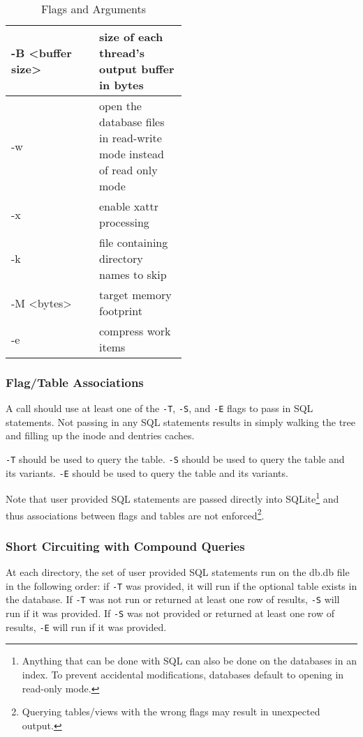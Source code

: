 \begin{table}[h!]
\begin{tabular*}{\linewidth}{l|p{0.5\linewidth}}
    \hline
    -B \textless buffer size\textgreater & size of each thread's output buffer in bytes \\
    \hline
    -w & open the database files in read-write mode instead of read only mode \\
    \hline
    -x & enable xattr processing \\
    \hline
    -k & file containing directory names to skip \\
    \hline
    -M \textless bytes\textgreater & target memory footprint \\
    \hline
    -e & compress work items \\
    \hline
  \end{tabular*}
  \caption{\label{tab:widgets} \gufiquery Flags and Arguments}
\end{table}

\subsubsection{Flag/Table Associations}
A \gufiquery call should use at least one of the \texttt{-T},
\texttt{-S}, and \texttt{-E} flags to pass in SQL statements. Not
passing in any SQL statements results in \gufiquery simply walking the
tree and filling up the inode and dentries caches.

\texttt{-T} should be used to query the \treesummary
table. \texttt{-S} should be used to query the \summary table and its
variants. \texttt{-E} should be used to query the \entries table and
its variants.

Note that user provided SQL statements are passed directly into
SQLite\footnote{Anything that can be done with SQL can also be done on
  the databases in an index. To prevent accidental modifications,
  databases default to opening in read-only mode.} and thus
associations between flags and tables are not
enforced\footnote{Querying tables/views with the wrong flags may
  result in unexpected output.}.

\subsubsection{Short Circuiting with Compound Queries}
At each directory, the set of user provided SQL statements run on the
db.db file in the following order: if \texttt{-T} was provided, it
will run if the optional \treesummary table exists in the database. If
\texttt{-T} was not run or returned at least one row of results,
\texttt{-S} will run if it was provided. If \texttt{-S} was not
provided or returned at least one row of results, \texttt{-E} will run
if it was provided.

